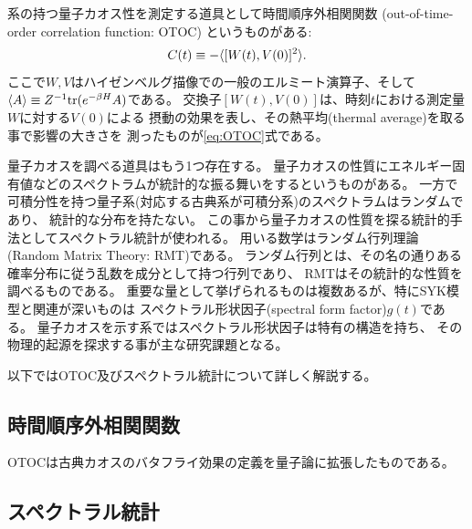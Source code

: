 系の持つ量子カオス性を測定する道具として時間順序外相関関数
(out-of-time-order correlation function: OTOC)
というものがある:
\begin{align}
	C(t) \equiv -\langle [W(t), V(0)]^2 \rangle.
	\label{eq:OTOC}
\end{align}
ここで$W, V$はハイゼンベルグ描像での一般のエルミート演算子、そして
$\langle A \rangle \equiv Z^{-1}\mathrm{tr}(e^{-\beta H}A)$である。
交換子$[W(t), V(0)]$は、時刻$t$における測定量$W$に対する$V(0)$による
摂動の効果を表し、その熱平均(thermal average)を取る事で影響の大きさを
測ったものが\eqref{eq:OTOC}式である。

量子カオスを調べる道具はもう1つ存在する。
量子カオスの性質にエネルギー固有値などのスペクトラムが統計的な振る舞いをするというものがある。
一方で可積分性を持つ量子系(対応する古典系が可積分系)のスペクトラムはランダムであり、
統計的な分布を持たない。
この事から量子カオスの性質を探る統計的手法としてスペクトラル統計が使われる。
用いる数学はランダム行列理論(Random Matrix Theory: RMT)である。
ランダム行列とは、その名の通りある確率分布に従う乱数を成分として持つ行列であり、
RMTはその統計的な性質を調べるものである。
重要な量として挙げられるものは複数あるが、特にSYK模型と関連が深いものは
スペクトラル形状因子(spectral form factor)$g(t)$である。
量子カオスを示す系ではスペクトラル形状因子は特有の構造を持ち、
その物理的起源を探求する事が主な研究課題となる。

以下ではOTOC及びスペクトラル統計について詳しく解説する。

\subsection{時間順序外相関関数}
OTOCは古典カオスのバタフライ効果の定義を量子論に拡張したものである。


\subsection{スペクトラル統計}

\pagebreak
